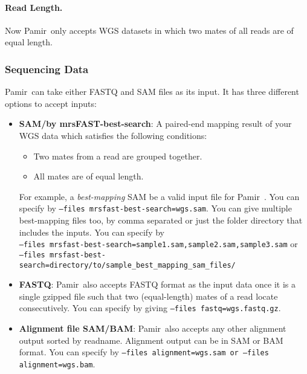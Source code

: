 \documentclass{article}
\newcommand{\toolName}{Pamir~}
\begin{document}
\paragraph{Read Length.} Now \toolName only accepts WGS datasets in which two mates of all reads are of equal length.

\subsubsection{Sequencing Data}
\toolName can take either FASTQ and SAM files as its input. It has three different options to accept inputs:
\begin{itemize}
\item \textbf{SAM/by mrsFAST-best-search}: A paired-end mapping result of your WGS data which satisfies the following conditions: 
    \begin{itemize}
    \item Two mates from a read are grouped together.
    \item All mates are of equal length.
    \end{itemize}
For example, a \textit{best-mapping} SAM be a valid input file for \toolName. 
You can specify by \texttt{--files mrsfast-best-search=wgs.sam}.
You can give multiple best-mapping files too, by comma separated or just the folder directory that includes the inputs. You can specify by\\
\texttt{--files mrsfast-best-search=sample1.sam,sample2.sam,sample3.sam} or \\
\texttt{--files mrsfast-best-search=directory/to/sample\_best\_mapping\_sam\_files/} 

\item \textbf{FASTQ}: \toolName also accepts FASTQ format as the input data once it is a single gzipped file such that two (equal-length) mates of a read locate consecutively. You can specify by giving \texttt{--files fastq=wgs.fastq.gz}.

\item \textbf{Alignment file SAM/BAM}: \toolName also accepts any other alignment output sorted by readname. Alignment output can be in SAM or BAM format. You can specify by \texttt{--files alignment=wgs.sam or --files alignment=wgs.bam}.
\end{itemize}
\end{document}
